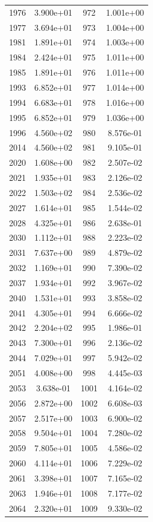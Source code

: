 \documentclass[12pt]{article}
\begin{document}
\begin{longtable}{@{}cccc@{}}
1976 & 3.900e+01 & 972 & 1.001e+00 \\
1977 & 3.694e+01 & 973 & 1.004e+00 \\
1981 & 1.891e+01 & 974 & 1.003e+00 \\
1984 & 2.424e+01 & 975 & 1.011e+00 \\
1985 & 1.891e+01 & 976 & 1.011e+00 \\
1993 & 6.852e+01 & 977 & 1.014e+00 \\
1994 & 6.683e+01 & 978 & 1.016e+00 \\
1995 & 6.852e+01 & 979 & 1.036e+00 \\
1996 & 4.560e+02 & 980 & 8.576e-01 \\
2014 & 4.560e+02 & 981 & 9.105e-01 \\
2020 & 1.608e+00 & 982 & 2.507e-02 \\
2021 & 1.935e+01 & 983 & 2.126e-02 \\
2022 & 1.503e+02 & 984 & 2.536e-02 \\
2027 & 1.614e+01 & 985 & 1.544e-02 \\
2028 & 4.325e+01 & 986 & 2.638e-01 \\
2030 & 1.112e+01 & 988 & 2.223e-02 \\
2031 & 7.637e+00 & 989 & 4.879e-02 \\
2032 & 1.169e+01 & 990 & 7.390e-02 \\
2037 & 1.934e+01 & 992 & 3.967e-02 \\
2040 & 1.531e+01 & 993 & 3.858e-02 \\
2041 & 4.305e+01 & 994 & 6.666e-02 \\
2042 & 2.204e+02 & 995 & 1.986e-01 \\
2043 & 7.300e+01 & 996 & 2.136e-02 \\
2044 & 7.029e+01 & 997 & 5.942e-02 \\
2051 & 4.008e+00 & 998 & 4.445e-03 \\
2053 & 3.638e-01 & 1001 & 4.164e-02 \\
2056 & 2.872e+00 & 1002 & 6.608e-03 \\
2057 & 2.517e+00 & 1003 & 6.900e-02 \\
2058 & 9.504e+01 & 1004 & 7.280e-02 \\
2059 & 7.805e+01 & 1005 & 4.586e-02 \\
2060 & 4.114e+01 & 1006 & 7.229e-02 \\
2061 & 3.398e+01 & 1007 & 7.165e-02 \\
2063 & 1.946e+01 & 1008 & 7.177e-02 \\
2064 & 2.320e+01 & 1009 & 9.330e-02 \\

\end{longtable}
\end{document}
